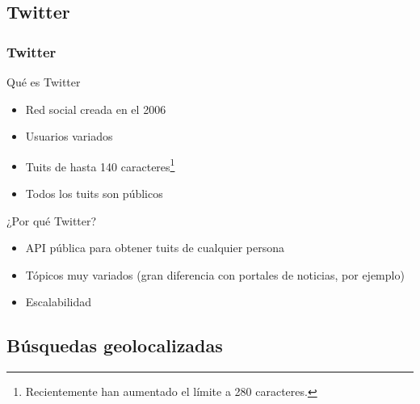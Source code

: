 \subsection{Twitter}
\begin{frame}[c]\frametitle{Twitter}

\begin{block}{Qué es Twitter}
    \begin{itemize}
        \item Red social creada en el 2006
        \item Usuarios variados
        \item Tuits de hasta 140 caracteres{\footnote{Recientemente han aumentado el límite a 280 caracteres.}}
        \item \alert{Todos los tuits son públicos}
    \end{itemize}
\end{block}

\begin{block}{¿Por qué Twitter?}
    \begin{itemize}
        \item API pública para obtener tuits de cualquier persona
        \item Tópicos muy variados (gran diferencia con portales de noticias, por ejemplo)
        \item Escalabilidad
    \end{itemize}
    
\end{block}


\end{frame}

\subsection{Búsquedas geolocalizadas}

